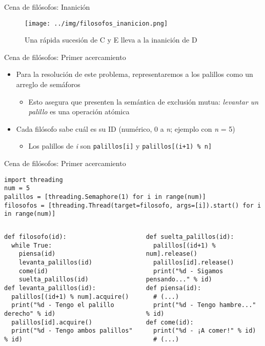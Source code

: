 \documentclass[presentation]{beamer}
\begin{document}
\begin{frame}[label={sec:org67cd20c}]{Cena de filósofos: Inanición}
\begin{center}
\begin{figure}[htbp]
\centering
\texttt{[image: ../img/filosofos\_inanicion.png]}
\caption{Una rápida sucesión de C y E lleva a la inanición de D}
\end{figure}
\end{center}
\end{frame}

\begin{frame}[label={sec:orgdd687ac},fragile]{Cena de filósofos: Primer acercamiento}
 \begin{itemize}
\item Para la resolución de este problema, representaremos a los palillos
como un arreglo de semáforos
\begin{itemize}
\item Esto asegura que presenten la semántica de exclusión mutua:
\emph{levantar un palillo} es una operación atómica
\end{itemize}
\item Cada filósofo sabe cuál es su ID (numérico, 0 a \emph{n}; ejemplo con \emph{n}
= 5)
\begin{itemize}
\item Los palillos de \emph{i} son \texttt{palillos[i]} y \texttt{palillos[(i+1) \% n]}
\end{itemize}
\end{itemize}
\end{frame}

\begin{frame}[label={sec:org333998f},fragile]{Cena de filósofos: Primer acercamiento}
 \begin{verbatim}
import threading
num = 5
palillos = [threading.Semaphore(1) for i in range(num)]
filosofos = [threading.Thread(target=filosofo, args=[i]).start() for i in range(num)]
\end{verbatim}
\begin{columns}\begin{column}{0.5\textwidth}
\begin{verbatim}
def filosofo(id):
  while True:
    piensa(id)
    levanta_palillos(id)
    come(id)
    suelta_palillos(id)
def levanta_palillos(id):
  palillos[(id+1) % num].acquire()
  print("%d - Tengo el palillo derecho" % id)
  palillos[id].acquire()
  print("%d - Tengo ambos palillos" % id)
\end{verbatim}
\end{column} \begin{column}{0.5\textwidth}
\begin{verbatim}
def suelta_palillos(id):
  palillos[(id+1) % num].release()
  palillos[id].release()
  print("%d - Sigamos pensando..." % id)
def piensa(id):
  # (...)
  print("%d - Tengo hambre..." % id)
def come(id):
  print("%d - ¡A comer!" % id)
  # (...)
\end{verbatim}
\end{column}\end{columns}
\end{frame}
\end{document}
